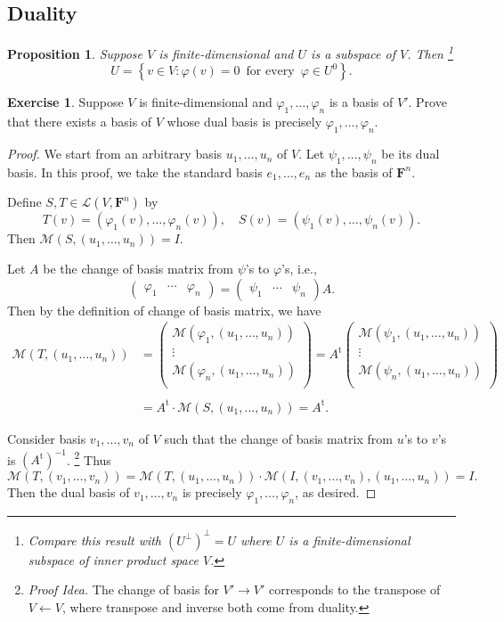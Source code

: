 \documentclass[nofonts,colorlinks]{tufte-handout}
\theoremstyle{plain} %
\newtheorem{prop}[thm]{Proposition}
\theoremstyle{definition}
\newtheorem{exer}[thm]{Exercise}
\theoremstyle{remark}
\def\idea{\textit{\color[rgb]{0,0,.55}Proof Idea. }}
\newcommand{\bra}[1]{\mathopen{}\left(#1\right)}
\newcommand{\cbra}[1]{\mathopen{}\left\{#1\right\}}
\renewcommand{\phi}{\varphi}
\newcommand{\F}{\mathbf{F}}
\renewcommand{\L}{\mathcal{L}}
\newcommand{\M}{\mathcal{M}}
\renewcommand{\intercal}{\mathrm{t}}
\begin{document}
\subsection{Duality}
\begin{prop}\label{prop: relation between subspace and annihilator}
	Suppose $V$ is finite-dimensional and $U$ is a subspace of $V$. Then%
	\footnote{Compare this result with $\bra{U^\perp}^\perp=U$ where $U$ is a finite-dimensional subspace of inner product space $V$.}
	\[U=\cbra{v\in V:\phi(v)=0\,\text{ for every }\,\phi\in U^0}.\]
\end{prop}

\begin{exer}
	Suppose $V$ is finite-dimensional and $\phi_1,\dots,\phi_n$ is a basis of $V'$. Prove that there exists a basis of $V$ whose dual basis is precisely $\phi_1,\dots,\phi_n$.
\end{exer}
\begin{proof}
	We start from an arbitrary basis $u_1,\dots,u_n$ of $V$. Let $\psi_1,\dots,\psi_n$ be its dual basis. In this proof, we take the standard basis $e_1,\dots,e_n$ as the basis of $\F^n$.
	
	Define $S,T\in\L\bra{V,\F^n}$ by
	\[T(v)=\bra{\phi_1(v),\dots,\phi_n(v)},\quad S(v)=\bra{\psi_1(v),\dots,\psi_n(v)}.\]
	Then $\M\bra{S,\bra{u_1,\dots,u_n}}=I$.
	
	Let $A$ be the change of basis matrix from $\psi$'s to $\phi$'s, i.e.,
	\[\begin{pmatrix}\phi_1&\cdots&\phi_n\end{pmatrix}=\begin{pmatrix}\psi_1&\cdots&\psi_n\end{pmatrix}A.\]
	Then by the definition of change of basis matrix, we have
	\begin{align*}
		\M\bra{T,\bra{u_1,\dots,u_n}}&=\begin{pmatrix}
			\M\bra{\phi_1,\bra{u_1,\dots,u_n}}\\
			\vdots\\
			\M\bra{\phi_n,\bra{u_1,\dots,u_n}}\\
		\end{pmatrix}
		=A^\intercal\begin{pmatrix}
			\M\bra{\psi_1,\bra{u_1,\dots,u_n}}\\
			\vdots\\
			\M\bra{\psi_n,\bra{u_1,\dots,u_n}}\\
		\end{pmatrix}\\\\
		&=A^\intercal\cdot\M\bra{S,\bra{u_1,\dots,u_n}}=A^\intercal.
	\end{align*}

	Consider basis $v_1,\dots,v_n$ of $V$ such that the change of basis matrix from $u$'s to $v$'s is $\bra{A^\intercal}^{-1}$.%
    \footnote{\idea The change of basis for $V'\to V'$ corresponds to the transpose of $V\leftarrow V$, where transpose and inverse both come from duality.}
	Thus
	\[\M\bra{T,\bra{v_1,\dots,v_n}}=\M\bra{T,\bra{u_1,\dots,u_n}}\cdot\M\bra{I,\bra{v_1,\dots,v_n},\bra{u_1,\dots,u_n}}=I.\]
	Then the dual basis of $v_1,\dots,v_n$ is precisely $\phi_1,\dots,\phi_n$, as desired.
\end{proof}
\end{document}

